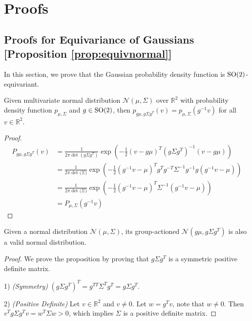 
\section{Proofs}
\label{app:equiv_dist}

\subsection{Proofs for Equivariance of Gaussians [Proposition \ref{prop:equivnormal}]}

In this section, we prove that the Gaussian probability density function is $\mathrm{SO}(2)$-equivariant.

\begin{prop*}
 Given multivariate normal distribution $\mathcal{N}(\mu,\Sigma)$ over $\mathbb{R}^2$ with probability density function $p_{\mu, \Sigma}$ and $g\in \mathrm{SO}(2)$, then $p_{g\mu, g\Sigma g^T} (v) = p_{\mu, \Sigma} (g^{-1}v)$ for all $v \in \mathbb{R}^2$.
\end{prop*}

\begin{proof}
\begin{align*}
P_{g\mu, g\Sigma g^T}(v) &= \frac{1}{2 \pi \det{(g\Sigma g^T)}} \exp{(-\frac{1}{2}(v-g\mu)^T (g \Sigma g^T)^{-1} (v - g\mu))} \\
 &= \frac{1}{2\pi \det{(\Sigma})} \exp{(-\frac{1}{2}(g^{-1}v-\mu)^T g^T g^{-T} \Sigma^{-1} g^{-1} g (g^{-1}v -\mu))} \\
&= \frac{1}{2\pi \det{(\Sigma})} \exp{(-\frac{1}{2}(g^{-1}v-\mu)^T \Sigma^{-1} (g^{-1}v -\mu))}\\ 
&= P_{\mu, \Sigma}(g^{-1}v) 
\end{align*}
\end{proof}


\begin{prop*} 
Given a normal distribution $\mathcal{N}(\mu,\Sigma)$, its group-actioned $\mathcal{N}(g\mu, g\Sigma g^T)$ is also a valid normal distribution. 
\end{prop*}

\begin{proof}
We prove the proposition by proving that $g\Sigma g^T$ is a symmetric positive definite matrix.

1) \textit{(Symmetry)} $(g\Sigma g^T)^T = g^{TT} \Sigma^T g^T = g\Sigma g^T$.

2) \textit{(Positive Definite)}  Let $v\in \mathbb{R}^2 $ and $v\neq 0$. Let $w = g^T v$, note that $w\neq 0$. Then $v^T g\Sigma g^T v =  w^T \Sigma w >0$, which implies $\Sigma$ is a positive definite matrix.  
\end{proof}

